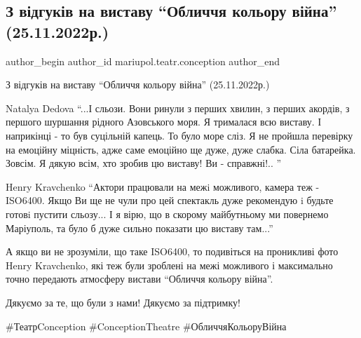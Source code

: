  
 
 
 
 

\subsection{З відгуків на виставу \enquote{Обличчя кольору війна} (25.11.2022р.)}
\label{sec:27_11_2022.fb.mariupol.teatr.conception.1.z_vidgukiv_na_vystavu_oblycchja_koljoru_vijna_25_11_2022}

\ifcmt
 author_begin
   author_id mariupol.teatr.conception
 author_end
\fi

З відгуків на виставу \enquote{Обличчя кольору війна} (25.11.2022р.)

Natalya Dedova \enquote{...І сльози. Вони ринули з перших хвилин, з перших акордів, з
першого шуршання рідного Азовського моря. Я трималася всю виставу. І наприкінці
- то був суцільній капець. То було море сліз. Я не пройшла перевірку на
емоційну міцність, адже саме емоційно ще дуже, дуже слабка. Сіла батарейка.
Зовсім. Я дякую всім, хто зробив цю виставу! Ви - справжні!.. }

Henry Kravchenko \enquote{Актори працювали на межi можливого, камера теж - ISO6400.
Якщо Ви ще не чули про цей спектакль дуже рекомендую i будьте готовi пустити
сльозу... І я вірю, що в скорому майбутньому ми повернемо Маріуполь, та було б
дуже сильно показати цю виставу там...}

А якщо ви не зрозуміли, що таке ISO6400, то подивіться на проникливі фото Henry
Kravchenko, які теж були зроблені на межі можливого і максимально точно
передають атмосферу вистави \enquote{Обличчя кольору війна}.

Дякуємо за те, що були з нами! Дякуємо за підтримку!

\#ТеатрConception \#ConceptionTheatre \#ОбличчяКольоруВійна
